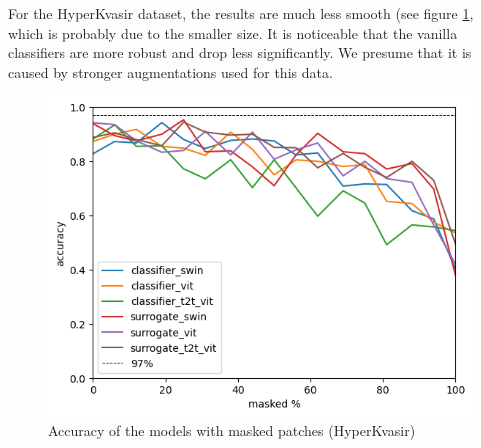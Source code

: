 \documentclass[magisterska,en]{pracamgr}
\begin{document}
For the HyperKvasir dataset, the results are much less smooth (see figure \ref{gastro_masked_accuracy}, which is probably due to the smaller size. It is noticeable that the vanilla classifiers are more robust and drop less significantly. We presume that it is caused by stronger augmentations used for this data.



\begin{figure}[H]
\centering
\includegraphics[scale=0.8]{./images/gastro_masked_accuracy.png}
\caption{Accuracy of the models with masked patches (HyperKvasir)}
\label{gastro_masked_accuracy}
\end{figure}
\end{document}
